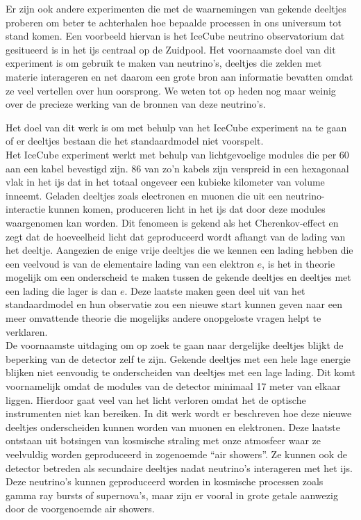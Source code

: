 Er zijn ook andere experimenten die met de waarnemingen van gekende deeltjes proberen om beter te achterhalen hoe bepaalde processen in ons universum tot stand komen. Een voorbeeld hiervan is het IceCube neutrino observatorium dat gesitueerd is in het ijs centraal op de Zuidpool. Het voornaamste doel van dit experiment is om gebruik te maken van neutrino's, deeltjes die zelden met materie interageren en net daarom een grote bron aan informatie bevatten omdat ze veel vertellen over hun oorsprong. We weten tot op heden nog maar weinig over de precieze werking van de bronnen van deze neutrino's.

Het doel van dit werk is om met behulp van het IceCube experiment na te gaan of er deeltjes bestaan die het standaardmodel niet voorspelt.\\

\noindent Het IceCube experiment werkt met behulp van lichtgevoelige modules die per 60 aan een kabel bevestigd zijn. 86 van zo'n kabels zijn verspreid in een hexagonaal vlak in het ijs dat in het totaal ongeveer een kubieke kilometer van volume inneemt. Geladen deeltjes zoals electronen en muonen die uit een neutrino-interactie kunnen komen, produceren licht in het ijs dat door deze modules waargenomen kan worden. Dit fenomeen is gekend als het Cherenkov-effect en zegt dat de hoeveelheid licht dat geproduceerd wordt afhangt van de lading van het deeltje. Aangezien de enige vrije deeltjes die we kennen een lading hebben die een veelvoud is van de elementaire lading van een elektron $e$, is het in theorie mogelijk om een onderscheid te maken tussen de gekende deeltjes en deeltjes met een lading die lager is dan $e$. Deze laatste maken geen deel uit van het standaardmodel en hun observatie zou een nieuwe start kunnen geven naar een meer omvattende theorie die mogelijks andere onopgeloste vragen helpt te verklaren.\\

\noindent De voornaamste uitdaging om op zoek te gaan naar dergelijke deeltjes blijkt de beperking van de detector zelf te zijn. Gekende deeltjes met een hele lage energie blijken niet eenvoudig te onderscheiden van deeltjes met een lage lading. Dit komt voornamelijk omdat de modules van de detector minimaal 17 meter van elkaar liggen. Hierdoor gaat veel van het licht verloren omdat het de optische instrumenten niet kan bereiken. In dit werk wordt er beschreven hoe deze nieuwe deeltjes onderscheiden kunnen worden van muonen en elektronen. Deze laatste ontstaan uit botsingen van kosmische straling met onze atmosfeer waar ze veelvuldig worden geproduceerd in zogenoemde ``air showers''. Ze kunnen ook de detector betreden als secundaire deeltjes nadat neutrino's interageren met het ijs. Deze neutrino's kunnen geproduceerd worden in kosmische processen zoals gamma ray bursts of supernova's, maar zijn er vooral in grote getale aanwezig door de voorgenoemde air showers.\\

